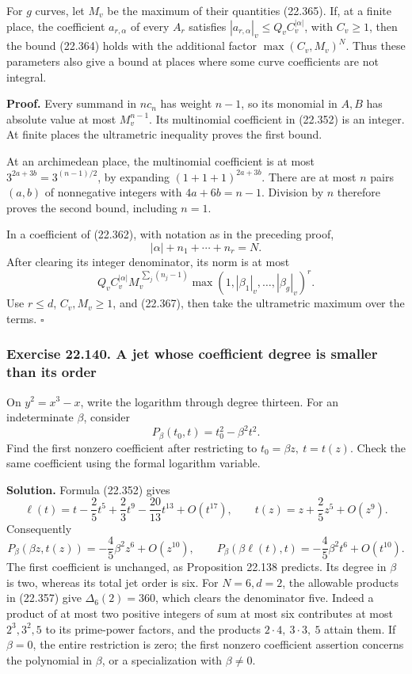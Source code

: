 \documentclass[
  11pt,
  a4paper,
]{article}
\begin{document}
For \(g\) curves, let \(M_v\) be the maximum of their quantities
(22.365). If, at a finite place, the coefficient \(a_{r,\alpha}\) of
every \(A_r\) satisfies \(|a_{r,\alpha}|_v\le Q_v C_v^{|\alpha|}\), with
\(C_v\ge1\), then the bound (22.364) holds with the additional factor
\(\max(C_v,M_v)^N\). Thus these parameters also give a bound at places
where some curve coefficients are not integral.

\textbf{Proof.} Every summand in \(nc_n\) has weight \(n-1\), so its
monomial in \(A,B\) has absolute value at most \(M_v^{n-1}\). Its
multinomial coefficient in (22.352) is an integer. At finite places the
ultrametric inequality proves the first bound.

At an archimedean place, the multinomial coefficient is at most
\(3^{2a+3b}=3^{(n-1)/2}\), by expanding \((1+1+1)^{2a+3b}\). There are
at most \(n\) pairs \((a,b)\) of nonnegative integers with
\(4a+6b=n-1\). Division by \(n\) therefore proves the second bound,
including \(n=1\).

In a coefficient of (22.362), with notation as in the preceding proof,
\[
 |\alpha|+n_1+\cdots+n_r=N.
 \tag{22.367}
\] After clearing its integer denominator, its norm is at most \[
 Q_v C_v^{|\alpha|}
 M_v^{\,\sum_j(n_j-1)}
 \max(1,|\beta_1|_v,\ldots,|\beta_g|_v)^r.
 \tag{22.368}
\] Use \(r\le d\), \(C_v,M_v\ge1\), and (22.367), then take the
ultrametric maximum over the terms. \(\square\)

\subsubsection{Exercise 22.140. A jet whose coefficient degree is
smaller than its
order}\label{exercise-22.140.-a-jet-whose-coefficient-degree-is-smaller-than-its-order}

On \(y^2=x^3-x\), write the logarithm through degree thirteen. For an
indeterminate \(\beta\), consider \[
 P_\beta(t_0,t)=t_0^2-\beta^2t^2.
 \tag{22.369}
\] Find the first nonzero coefficient after restricting to
\(t_0=\beta z,\ t=t(z)\). Check the same coefficient using the formal
logarithm variable.

\textbf{Solution.} Formula (22.352) gives \[
 \ell(t)=t-\frac25t^5+\frac23t^9-\frac{20}{13}t^{13}
                       +O(t^{17}),\qquad
 t(z)=z+\frac25z^5+O(z^9).
 \tag{22.370}
\] Consequently \[
 P_\beta(\beta z,t(z))
       =-\frac45\beta^2z^6+O(z^{10}),\qquad
 P_\beta(\beta\ell(t),t)
       =-\frac45\beta^2t^6+O(t^{10}).
 \tag{22.371}
\] The first coefficient is unchanged, as Proposition 22.138 predicts.
Its degree in \(\beta\) is two, whereas its total jet order is six. For
\(N=6,d=2\), the allowable products in (22.357) give
\(\Delta_6(2)=360\), which clears the denominator five. Indeed a product
of at most two positive integers of sum at most six contributes at most
\(2^3,3^2,5\) to its prime-power factors, and the products
\(2\cdot4,\ 3\cdot3,\ 5\) attain them. If \(\beta=0\), the entire
restriction is zero; the first nonzero coefficient assertion concerns
the polynomial in \(\beta\), or a specialization with \(\beta\ne0\).
\end{document}
